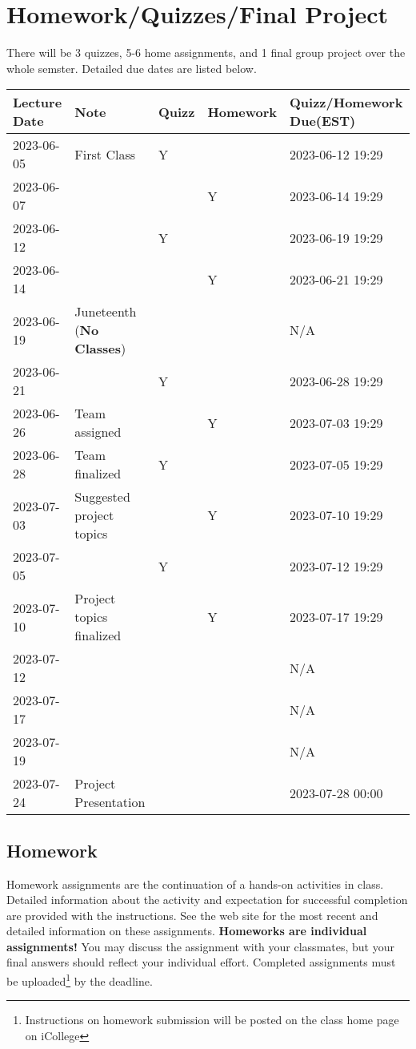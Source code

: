 \documentclass{article}
\begin{document}
\section{Homework/Quizzes/Final Project}
There will be 3 quizzes, 5-6 home assignments, and 1 final group project over the whole semster. Detailed due dates are listed below.
\begin{center}
	\begin{tabular}{lllll}
		\hline
		Lecture Date & Note & Quizz & Homework & Quizz/Homework Due(EST) \\
		\hline
		2023-06-05 & First Class & Y &  & 2023-06-12 19:29\\
        2023-06-07 &  &  & Y & 2023-06-14 19:29 \\
        2023-06-12 &  & Y &  & 2023-06-19 19:29 \\
        2023-06-14 &  &  & Y & 2023-06-21 19:29 \\
        2023-06-19 & Juneteenth (\textbf{No Classes})  &  &  &  N/A\\
        2023-06-21 &  & Y &  & 2023-06-28 19:29 \\
        2023-06-26 & Team assigned &  & Y & 2023-07-03 19:29 \\
        2023-06-28 & Team finalized  & Y &  & 2023-07-05 19:29 \\
        2023-07-03 & Suggested project topics &  & Y & 2023-07-10 19:29 \\
        2023-07-05 &  & Y &  & 2023-07-12 19:29 \\
        2023-07-10 & Project topics finalized &  & Y & 2023-07-17 19:29 \\
        2023-07-12 &  &  &  &  N/A\\
        2023-07-17 &  &  &  &  N/A\\
        2023-07-19 &  &  &  &  N/A\\
		2023-07-24 & Project Presentation &  &  & 2023-07-28 00:00\\
		\hline        
	\end{tabular}
\end{center}



\subsection{Homework}
Homework assignments are the continuation of a hands-on activities in class. Detailed information about the activity and expectation for successful completion are provided with the instructions. See the web site for the most recent and detailed information on these assignments. \textbf{Homeworks are individual assignments!} You may discuss the assignment with your classmates, but your ﬁnal answers should reﬂect your individual eﬀort. Completed assignments must be uploaded\footnote{Instructions on homework submission will be posted on the class home page on iCollege} by the deadline.
\end{document}

